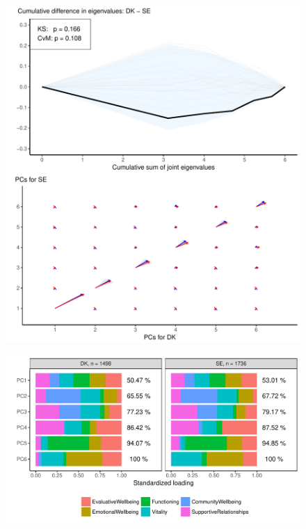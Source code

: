 \documentclass[]{interact}
\theoremstyle{plain}%
\theoremstyle{definition}
\theoremstyle{remark}
\begin{document}
\begin{figure}[H]
\center
\includegraphics[scale=0.8]{Figure9_PCADSC_v3.pdf}
\caption{}%
\label{plotSE.cehair}
\end{figure}

\begin{figure}[H]
\center
\includegraphics[scale=0.8]{Figure10_PCADSC_v3.pdf}
\caption{}%
\label{plotSE.pancake}
\end{figure}
\end{document}
